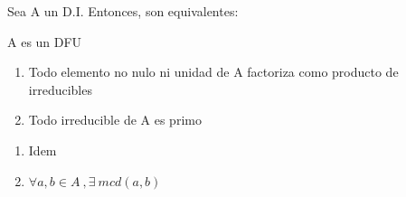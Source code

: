 \begin{nth}
	Sea A un D.I. Entonces, son equivalentes:
	\begin{nlist}
	\item A es un DFU
	\item \begin{enumerate}
	\item Todo elemento no nulo ni unidad de A factoriza como producto de irreducibles
	\item Todo irreducible de A es primo
\end{enumerate}
	\item \begin{enumerate}
	\item Idem
	\item $\forall a,b \in A \ , \exists \ mcd(a,b)$
\end{enumerate}
\end{nlist}
\end{nth}
